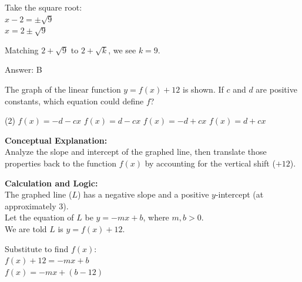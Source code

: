 \documentclass[11pt,paper=a4,answers]{exam}
\begin{document}
\begin{questions}
\begin{solution}
\vspace{10pt}

Take the square root: \\
$x - 2 = \pm \sqrt{9}$ \\
$x = 2 \pm \sqrt{9}$

\vspace{10pt}

Matching $2 + \sqrt{9}$ to $2 + \sqrt{k}$, we see $k = 9$.

\vspace{25pt}

Answer: \colorbox{yellow!100}{B}
\end{solution}

\question
\begin{center}
\end{center}
The graph of the linear function $y = f(x) + 12$ is shown. If $c$ and $d$ are positive constants, which equation could define $f$?
\begin{tasks}(2)
    \task $f(x) = -d - cx$
    \task $f(x) = d - cx$
    \task $f(x) = -d + cx$
    \task $f(x) = d + cx$
\end{tasks}

\begin{solution}
\textbf{Conceptual Explanation:} \\
Analyze the slope and intercept of the graphed line, then translate those properties back to the function $f(x)$ by accounting for the vertical shift ($+12$).

\vspace{20pt}

\textbf{Calculation and Logic:} \\
The graphed line ($L$) has a negative slope and a positive $y$-intercept (at approximately 3). \\
Let the equation of $L$ be $y = -mx + b$, where $m, b > 0$. \\
We are told $L$ is $y = f(x) + 12$.

\vspace{10pt}

Substitute to find $f(x)$: \\
$f(x) + 12 = -mx + b$ \\
$f(x) = -mx + (b - 12)$


\end{solution}
\end{questions}
\end{document}
